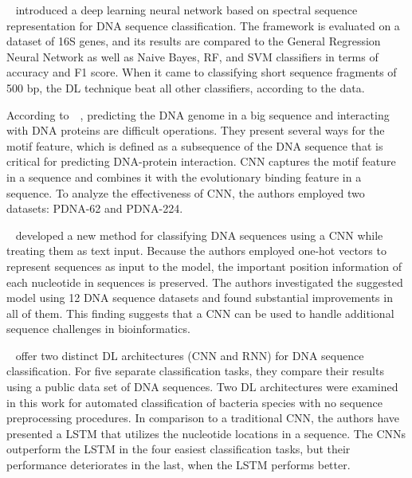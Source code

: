 \citeauthor{Rizzo2015AClassification}~\cite{Rizzo2015AClassification} introduced a deep learning neural network based on spectral sequence representation for \gls{DNA} sequence classification. The framework is evaluated on a dataset of 16S genes, and its results are compared to the General Regression Neural Network as well as Naive Bayes, \gls{RF}, and \gls{SVM} classifiers in terms of accuracy and F1 score. When it came to classifying short sequence fragments of 500 bp, the \gls{DL} technique beat all other classifiers, according to the data.

According to~\citeauthor{Zhou2017CNNsite:Features}~\cite{Zhou2017CNNsite:Features}, predicting the \gls{DNA} genome in a big sequence and interacting with \gls{DNA} proteins are difficult operations. They present several ways for the motif feature, which is defined as a subsequence of the \gls{DNA} sequence that is critical for predicting \gls{DNA}-protein interaction. \gls{CNN} captures the motif feature in a sequence and combines it with the evolutionary binding feature in a sequence. To analyze the effectiveness of \gls{CNN}, the authors employed two datasets: PDNA-62 and PDNA-224.

\citeauthor{Nguyen2016DNANetwork}~\cite{Nguyen2016DNANetwork} developed a new method for classifying \gls{DNA} sequences using a \gls{CNN} while treating them as text input. Because the authors employed one-hot vectors to represent sequences as input to the model, the important position information of each nucleotide in sequences is preserved. The authors investigated the suggested model using 12 \gls{DNA} sequence datasets and found substantial improvements in all of them. This finding suggests that a \gls{CNN} can be used to handle additional sequence challenges in bioinformatics.

\citeauthor{LoBosco2017DeepClassification}~\cite{LoBosco2017DeepClassification} offer two distinct \gls{DL} architectures (\gls{CNN} and \gls{RNN}) for \gls{DNA} sequence classification. For five separate classification tasks, they compare their results using a public data set of \gls{DNA} sequences. Two \gls{DL} architectures were examined in this work for automated classification of bacteria species with no sequence preprocessing procedures. In comparison to a traditional \gls{CNN}, the authors have presented a \gls{LSTM} that utilizes the nucleotide locations in a sequence. The \gls{CNN}s outperform the \gls{LSTM} in the four easiest classification tasks, but their performance deteriorates in the last, when the \gls{LSTM} performs better.

